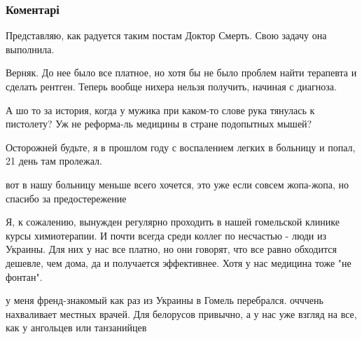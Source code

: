  
 
 
 
 
\subsubsection{Коментарі}

\begin{itemize} %
Представляю, как радуется таким постам Доктор Смерть. Свою задачу она выполнила.

\begin{itemize} %

Верняк. До нее было все платное, но хотя бы не было проблем найти терапевта и
сделать рентген. Теперь вообще нихера нельзя получить, начиная с диагноза.

\end{itemize} %

А шо то за история, когда у мужика при каком-то слове рука тянулась к пистолету? Уж не реформа-ль медицины в стране подопытных мышей?

Осторожней будьте, я в прошлом году с воспалением легких в больницу и попал, 21 день там пролежал.

\begin{itemize} %
вот в нашу больницу меньше всего хочется, это уже если совсем жопа-жопа, но спасибо за предостережение
\end{itemize} %


Я, к сожалению, вынужден регулярно проходить в нашей гомельской клинике курсы
химиотерапии. И почти всегда среди коллег по несчастью - люди из Украины. Для
них у нас все платно, но они говорят, что все равно обходится дешевле, чем
дома, да и получается эффективнее. Хотя у нас медицина тоже "не фонтан".

\begin{itemize} %

у меня френд-знакомый как раз из Украины в Гомель перебрался. очччень
нахваливает местных врачей. Для белорусов привычно, а у нас уже взгляд на все,
как у ангольцев или танзанийцев


\end{itemize}
\end{itemize}

